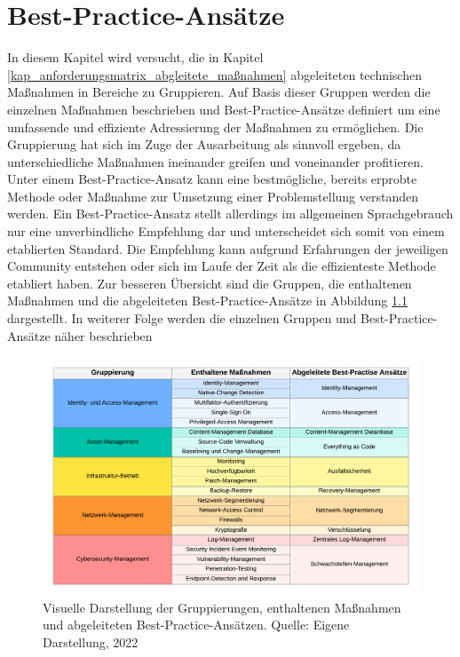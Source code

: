 \setlength{\parindent}{0em} 

\chapter{Best-Practice-Ansätze}
\label{cha:Auswertung}
In diesem Kapitel wird versucht, die in Kapitel \ref{kap_anforderungsmatrix_abgleitete_maßnahmen} abgeleiteten technischen Maßnahmen in Bereiche zu Gruppieren. Auf Basis dieser Gruppen werden die einzelnen Maßnahmen beschrieben und Best-Practice-Ansätze definiert um eine umfassende und effiziente Adressierung der Maßnahmen zu ermöglichen. Die Gruppierung hat sich im Zuge der Ausarbeitung als sinnvoll ergeben, da unterschiedliche Maßnahmen ineinander greifen und voneinander profitieren.  
\bigbreak
Unter einem Best-Practice-Ansatz kann eine bestmögliche, bereits erprobte Methode oder Maßnahme zur Umsetzung einer Problemstellung verstanden werden. Ein Best-Practice-Ansatz stellt allerdings im allgemeinen Sprachgebrauch nur eine unverbindliche Empfehlung dar und unterscheidet sich somit von einem etablierten Standard. Die Empfehlung kann aufgrund Erfahrungen der jeweiligen Community entstehen oder sich im Laufe der Zeit als die effizienteste Methode etabliert haben. \autocite{duden} 
\bigbreak
Zur besseren Übersicht sind die Gruppen, die enthaltenen Maßnahmen und die abgeleiteten Best-Practice-Ansätze in Abbildung \ref{fig:bp-matrix} dargestellt. In weiterer Folge werden die einzelnen Gruppen und Best-Practice-Ansätze näher beschrieben
\begin{figure}[H]
    \centering
  \includegraphics[width=\linewidth]{images/uploads/a_figure_15.png}
  \caption{Visuelle Darstellung der Gruppierungen, enthaltenen Maßnahmen und abgeleiteten Best-Practice-Ansätzen. Quelle: Eigene Darstellung, 2022}
  \label{fig:bp-matrix}
\end{figure}

